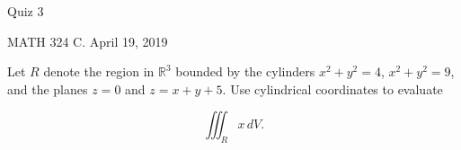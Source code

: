 \documentclass{exam}
\begin{document}
 
\begin{center} \begin{Large} Quiz 3\end{Large}

\vspace{5mm}
MATH 324 C. April 19, 2019
\end{center} 

\vspace{5mm}

\begin{center}
\end{center}

\vspace{1cm}
 

\vspace{1cm}

\begin{questions}
\question Let $R$ denote the region in $\mathbb{R}^3$ bounded by the cylinders $x^2 + y^2 = 4$, $x^2 + y^2 = 9$, and the planes $z = 0$ and $z = x + y + 5$. Use cylindrical coordinates to evaluate 

\[
\iiint_R x \, dV.
\]

\end{questions}
\end{document}
